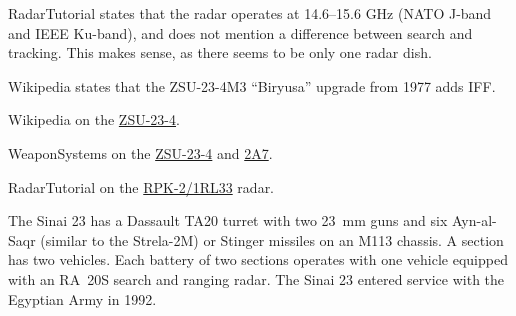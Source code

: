 \begin{withcounters}
{        RadarTutorial states that the radar operates at 14.6--15.6 GHz (NATO J-band and IEEE Ku-band), and does not mention a difference between search and tracking. This makes sense, as there seems to be only one radar dish.

        Wikipedia states that the ZSU-23-4M3 “Biryusa” upgrade from 1977 adds IFF.

        \begin{notesources}
            \item Wikipedia on the \href{https://en.wikipedia.org/wiki/ZSU-23-4_Shilka}{ZSU-23-4}.
            \item WeaponSystems on the \href{https://weaponsystems.net/system/452-ZSU-23-4\%20Shilka}{ZSU-23-4} and \href{https://weaponsystems.net/system/1580-23mm\%202A14}{2A7}.
            \item RadarTutorial on the \href{https://www.radartutorial.eu/19.kartei/11.ancient4/karte088.en.html}{RPK-2/1RL33} radar.
        \end{notesources}
    }


    The Sinai 23 has a Dassault TA20 turret with two 23~mm guns and six Ayn-al-Saqr (similar to the Strela-2M) or Stinger missiles on an M113 chassis.
    A section has two vehicles.
    Each battery of two sections operates with one vehicle equipped with an RA~20S search and ranging radar.
    The Sinai 23 entered service with the Egyptian Army in 1992.%
\end{withcounters}
